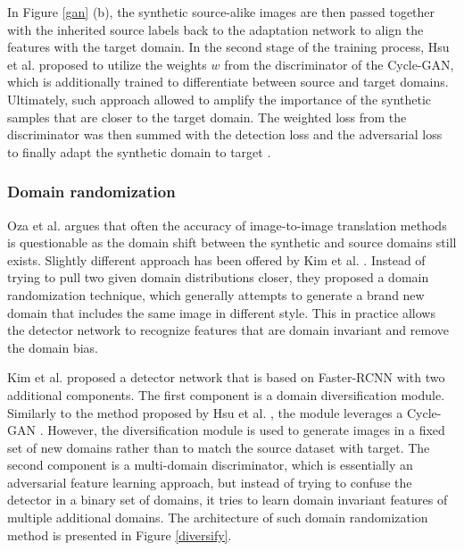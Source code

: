 In Figure \ref{gan} (b), the synthetic source-alike images are then passed together with the inherited source labels back to the adaptation network to align the features with the target domain. In the second stage of the training process, Hsu et al. proposed to utilize the weights $w$ from the discriminator of the Cycle-GAN, which is additionally trained to differentiate between source and target domains. Ultimately, such approach allowed to amplify the importance of the synthetic samples that are closer to the target domain. The weighted loss from the discriminator was then summed with the detection loss and the adversarial loss to finally adapt the synthetic domain to target \cite{Hsu2019}. 

\subsubsection{Domain randomization}

Oza et al. \cite{Oza2021} argues that often the accuracy of image-to-image translation methods is questionable as the domain shift between the synthetic and source domains still exists. Slightly different approach has been offered by Kim et al. \cite{Kim2019}. Instead of trying to pull two given domain distributions closer, they proposed a domain randomization technique, which generally attempts to generate a brand new domain that includes the same image in different style. This in practice allows the detector network to recognize features that are domain invariant and remove the domain bias. 

Kim et al. proposed a detector network that is based on Faster-RCNN with two additional components. The first component is a domain diversification module. Similarly to the method proposed by Hsu et al. \cite{Hsu2019}, the module leverages a Cycle-GAN \cite{Zhu2017}. However, the diversification module is used to generate images in a fixed set of new domains rather than to match the source dataset with target.  The second component is a multi-domain discriminator, which is essentially an adversarial feature learning approach, but instead of trying to confuse the detector in a binary set of domains, it tries to learn domain invariant features of multiple additional domains. The architecture of such domain randomization method is presented in Figure \ref{diversify}.

